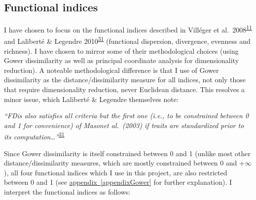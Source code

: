 \documentclass[
  10pt,
]{article}
\newcommand{\bquote}{\begin{adjustwidth}{0.05\textwidth}{0.05\textwidth}\centering}
\newcommand{\equote}{\end{adjustwidth}}
\newcommand{\aref}[1]{\hyperref[#1]{appendix~\ref*{#1}}}
\begin{document}
\hypertarget{functional-indices}{%
\subsection{Functional indices}\label{functional-indices}}

I have chosen to focus on the functional indices described in Villéger et al.~2008\textsuperscript{\protect\hyperlink{ref-Villeger2008}{11}} and Laliberté \& Legendre 2010\textsuperscript{\protect\hyperlink{ref-Laliberte2010}{31}} (functional dispersion, divergence, evenness and richness). I have chosen to mirror some of their methodological choices (using Gower dissimilarity as well as principal coordinate analysis for dimensionality reduction). A noteable methodological difference is that I use of Gower dissimilarity as the distance/dissimilarity measure for all indices, not only those that require dimensionality reduction, never Euclidean distance. This resolves a minor issue, which Laliberté \& Legendre themselves note:

\bquote

\emph{``FDis also satisfies all criteria but the first one (i.e., to be constrained between 0 and 1 for convenience) of Masonet al.~(2003) if traits are standardized prior to its computation\ldots{}''}\textsuperscript{\protect\hyperlink{ref-Laliberte2010}{31}}

\equote

Since Gower dissimilarity is itself constrained between 0 and 1 (unlike most other distance/dissimilarity measures, which are mostly constrained between 0 and +\(\infty\)), all four functional indices which I use in this project, are also restricted between 0 and 1 (see \aref{appendixGower} for further explanation). I interpret the functional indices as follows:
\end{document}
